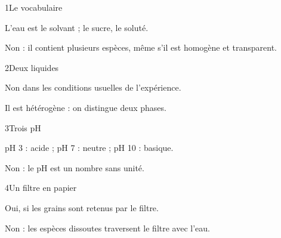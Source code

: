\par\noindent\begin{minipage}{\linewidth}
\begin{corrige}{1}{Le vocabulaire}
\begin{questions}
\item L’eau est le solvant ; le sucre, le soluté.
\item Non : il contient plusieurs espèces, même s’il est homogène et transparent.
\end{questions}
\end{corrige}
\end{minipage}
\par\noindent\begin{minipage}{\linewidth}
\begin{corrige}{2}{Deux liquides}
\begin{questions}
\item Non dans les conditions usuelles de l’expérience.
\item Il est hétérogène : on distingue deux phases.
\end{questions}
\end{corrige}
\end{minipage}
\par\noindent\begin{minipage}{\linewidth}
\begin{corrige}{3}{Trois pH}
\begin{questions}
\item pH 3 : acide ; pH 7 : neutre ; pH 10 : basique.
\item Non : le pH est un nombre sans unité.
\end{questions}
\end{corrige}
\end{minipage}
\par\noindent\begin{minipage}{\linewidth}
\begin{corrige}{4}{Un filtre en papier}
\begin{questions}
\item Oui, si les grains sont retenus par le filtre.
\item Non : les espèces dissoutes traversent le filtre avec l’eau.
\end{questions}
\end{corrige}
\end{minipage}
